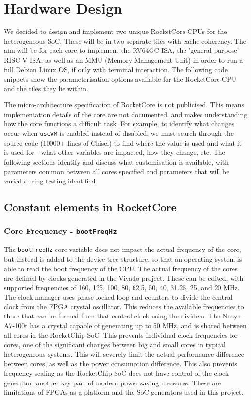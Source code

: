 \chapter{Hardware Design}
\label{ch:hw_design}
We decided to design and implement two unique RocketCore CPUs for the heterogeneous SoC. These will be in two separate tiles with cache coherency. The aim will be for each core to implement the RV64GC ISA, the 'general-purpose' RISC-V ISA, as well as an MMU (Memory Management Unit) in order to run a full Debian Linux OS, if only with terminal interaction. The following code snippets show the parameterisation options available for the RocketCore CPU and the tiles they lie within.


The micro-architecture specification of RocketCore is not publicised. This means implementation details of the core are not documented, and makes understanding how the core functions a difficult task. For example, to identify what changes occur when \texttt{useVM} is enabled instead of disabled, we must search through the source code (10000+ lines of Chisel\cite{}) to find where the value is used and what it is used for - what other variables are impacted, how they change, etc. The following sections identify and discuss what customisation is available, with parameters common between all cores specified and parameters that will be varied during testing identified.
\section{Constant elements in RocketCore}
\subsection{Core Frequency - \texttt{bootFreqHz}}
The \texttt{bootFreqHz} core variable does not impact the actual frequency of the core, but instead is added to the device tree structure, so that an operating system is able to read the boot frequency of the CPU. The actual frequency of the cores are defined by clocks generated in the Vivado project. These can be edited, with supported frequencies of 160, 125, 100, 80, 62.5, 50, 40, 31.25, 25, and 20 MHz. The clock manager uses phase locked loop and counters to divide the central clock from the FPGA crystal oscillator. This reduces the available frequencies to those that can be formed from that central clock using the dividers. The Nexys-A7-100t has a crystal capable of generating up to 50 MHz, and is shared between all cores in the RocketChip SoC. This prevents individual clock frequencies for cores, one of the significant changes between big and small cores in typical heterogeneous systems. This will severely limit the actual performance difference between cores, as well as the power consumption difference. This also prevents frequency scaling as the RocketChip SoC does not have control of the clock generator, another key part of modern power saving measures. These are limitations of FPGAs as a platform and the SoC generators used in this project.


